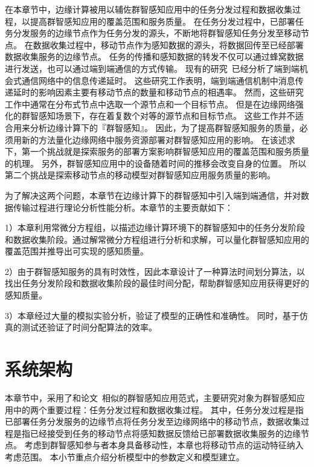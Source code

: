 在本章节中，边缘计算被用以辅佐群智感知应用中的任务分发过程和数据收集过程，以提高群智感知应用的覆盖范围和服务质量。
在任务分发过程中，已部署任务分发服务的边缘节点作为任务分发的源头，不断地将群智感知任务分发至移动节点。
在数据收集过程中，移动节点作为感知数据的源头，将数据回传至已经部署数据收集服务的边缘节点。
任务的传播和感知数据的转发不仅可以通过蜂窝数据进行发送，也可以通过端到端通信的方式传输。
现有的研究~\cite{DBLP:conf/wcnc/QinF13,DBLP:journals/twc/LiW14,DBLP:journals/winet/ZhaoMLT18}已经分析了端到端机会式通信网络中的信息传递延时。
这些研究工作表明，端到端通信机制中消息传递延时的影响因素主要有移动节点的数量和移动节点的相遇率。
然而，这些研究工作中通常在分布式节点中选取一个源节点和一个目标节点。
但是在边缘网络强化的群智感知场景下，存在着复数个对等的源节点和目标节点。
这些工作并不适合用来分析边缘计算下的『群智感知』。
因此，为了提高群智感知服务的质量，必须用新的方法量化边缘网络中服务资源部署对群智感知应用的影响。
在该述求下，第一个挑战就是探索服务的部署方案影响群智感知应用的覆盖范围和服务质量的机理。
另外，群智感知应用中的设备随着时间的推移会改变自身的位置。
所以第二个挑战是探索移动节点的移动模型对群智感知应用服务质量的影响。

为了解决这两个问题，本章节在边缘计算下的群智感知中引入端到端通信，并对数据传输过程进行理论分析性能分析。本章节的主要贡献如下：

1）本章利用常微分方程组，以描述边缘计算环境下的群智感知中的任务分发阶段和数据收集阶段。通过解常微分方程组进行分析和求解，可以量化群智感知应用的覆盖范围并推导出可实现的感知质量。

2）由于群智感知服务的具有时效性，因此本章设计了一种算法时间划分算法，以找出任务分发阶段和数据收集阶段的最佳时间分配，帮助群智感知应用获得更好的感知质量。

3）本章经过大量的模拟实验分析，验证了模型的正确性和准确性。
同时，基于仿真的测试还验证了时间分配算法的效率。

\section{系统架构}


本章节中，采用了和论文~\cite{DBLP:journals/tpds/ZhaoMTL15}相似的群智感知应用范式，主要研究对象为群智感知应用中的两个重要过程：任务分发过程和数据收集过程。
其中，任务分发过程是指已部署任务分发服务的边缘节点将任务分发至边缘网络中的移动节点，数据收集过程是指已经接受到任务的移动节点将感知数据反馈给已部署数据收集服务的边缘节点。
考虑到群智感知参与者本身具备移动性，本章也将移动节点的运动特征纳入考虑范围。
本小节重点介绍分析模型中的参数定义和模型建立。

